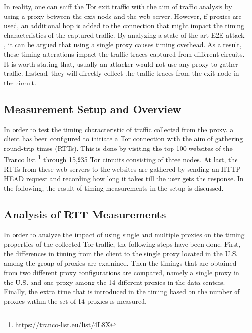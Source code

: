 \documentclass[sigconf]{acmart}
\begin{document}
In reality, one can sniff the Tor exit traffic with the aim of traffic analysis by using a proxy between the exit node and the web server. However, if proxies are used, an additional hop is added to the connection that might impact the timing characteristics of the captured traffic. By analyzing a state-of-the-art E2E attack \cite{nasr2018deepcorr}, it can be argued that using a single proxy causes timing overhead. As a result, these timing alterations impact the traffic traces captured from different circuits. It is worth stating that, usually an attacker would not use any proxy to gather traffic. Instead, they will  directly collect the traffic traces from the exit node in the circuit.

\subsection{Measurement Setup and Overview} \label{4.1}

In order to test the timing characteristic of traffic collected from the proxy, a client has been configured to initiate a Tor connection with the aim of gathering round-trip times (RTTs). This is done by visiting the top 100 websites of the Tranco list \cite{pochat2018tranco} \footnote{https://tranco-list.eu/list/4L8X} through 15,935 Tor circuits consisting of three nodes. At last, the RTTs from these web servers to the websites are gathered by sending an HTTP HEAD request and recording how long it takes till the user gets the response. In the following, the result of timing measurements in the setup is discussed. 

\subsection{Analysis of RTT Measurements} \label{4.2}

In order to analyze the impact of using single and multiple proxies on the timing properties of the collected Tor traffic, the following steps have been done. First, the differences in timing from the client to the single proxy located in the U.S. among the group of proxies are examined. Then the timings that are obtained from two different proxy configurations are compared, namely a single proxy in the U.S. and one proxy among the 14 different proxies in the data centers. Finally, the extra time that is introduced in the timing based on the number of proxies within the set of 14 proxies is measured. 

\vspace{3mm}
\end{document}
